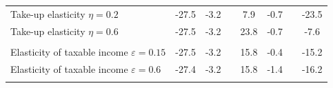 \begin{tabular*}{1.38\textwidth}{@{\extracolsep{\fill}}lccccccc}
Take-up elasticity $\eta = 0.2$
& -27.5 & -3.2 &
& 7.9 & -0.7 &
& -23.5  \\
Take-up elasticity $\eta = 0.6$
& -27.5  & -3.2 &
& 23.8 & -0.7 & &
-7.6  \\ 
\\
Elasticity of taxable income $\varepsilon = 0.15$ & -27.5
& -3.2 &
& 15.8 & -0.4 
& & -15.2  \\
Elasticity of taxable income $\varepsilon = 0.6$ & -27.4
& -3.2 &
& 15.8 & -1.4 & 
& -16.2  \\ \addlinespace
\bottomrule
\end{tabular*}

